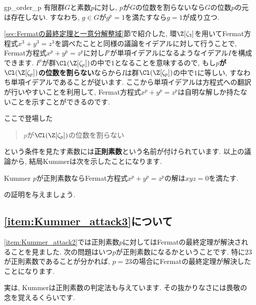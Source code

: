 \documentclass[11pt,b5paper,oneside,titlepage,lualatex]{ltjsreport}
\begin{document}
\begin{lem}{}{gp_order_p}
	有限群$ G $と素数$ p $に対し, $ p $が$ G $の位数を割らないなら$ G $の位数$ p $の元は存在しない. 
	すなわち, $ g \in G $が$ g^p = 1 $を満たすなら$ g = 1 $が成り立つ. 
\end{lem}

\ref{sec:Fermatの最終定理と一意分解整域}節で紹介した, 環$ \Z[\zeta_3] $を用いてFermat方程式$ x^3 + y^3 = z^3 $を調べたことと同様の議論をイデアルに対して行うことで, Fermat方程式$ x^p + y^p = z^p $に対し$ I^p $が単項イデアルになるようなイデアル$ I $を構成できます. 
$ I^p $が群$ \Cl(\Z[\zeta_p]) $の中で$ 1 $となることを意味するので, もし\textbf{$ p $が$ \Cl(\Z[\zeta_p]) $の位数を割らない}ならから$ I $は群$ \Cl(\Z[\zeta_p]) $の中で$ 1 $に等しい, すなわち単項イデアルであることが従います. 
ここから単項イデアルは方程式への翻訳が行いやすいことを利用して, Fermat方程式$ x^p + y^p = z^p $は自明な解しか持たないことを示すことができるのです. 

ここで登場した
\begin{quote}
	\centering
	$ p $が$ \Cl(\Z[\zeta_p]) $の位数を割らない
\end{quote}
という条件を見たす素数には\textbf{正則素数}という名前が付けられています. 
以上の議論から, 結局Kummerは次を示したことになります. 

\begin{thm}{Kummer}{}
	$ p $が正則素数ならFermat方程式$ x^p + y^p = z^p $の解は$ xyz = 0 $を満たす. 
\end{thm}


\begin{exc}{}{}
	の証明を与えましょう. 
\end{exc}


\subsection{\ref{item:Kummer_attack3}について}


\ref{item:Kummer_attack2}では正則素数$ p $に対してはFermatの最終定理が解決されることを見ました. 
次の問題はいつ$ p $が正則素数になるかということです. 
特に$ 23 $が正則素数であることが分かれば, $ p=23 $の場合にFermatの最終定理が解決したことになります. 

実は, Kummerは正則素数の判定法も与えています. 
その抜かりなさには畏敬の念を覚えるくらいです. 
\end{document}
